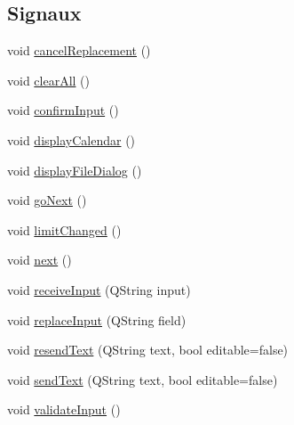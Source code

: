 \subsection*{Signaux}
\begin{DoxyCompactItemize}
\item 
void \hyperlink{classSimpleHotel_1_1SH__InOutStateMachine_abd6f8321716ad2f9a5e9d17cdedca275}{cancel\-Replacement} ()
\item 
void \hyperlink{classSimpleHotel_1_1SH__InOutStateMachine_a2b6d60f624ba23c8fc3e52f73e867c86}{clear\-All} ()
\item 
void \hyperlink{classSimpleHotel_1_1SH__InOutStateMachine_a949cdb448f813f201b6ca827d1c860e9}{confirm\-Input} ()
\item 
void \hyperlink{classSimpleHotel_1_1SH__InOutStateMachine_a2801413ae1cf6e87e38e5f5366622860}{display\-Calendar} ()
\item 
void \hyperlink{classSimpleHotel_1_1SH__InOutStateMachine_a034862097f23ae05f9691ae2b45f5d2a}{display\-File\-Dialog} ()
\item 
void \hyperlink{classSimpleHotel_1_1SH__GenericStateMachine_a1c0cc74f8134d2029b0cc8a2a929023d}{go\-Next} ()
\item 
void \hyperlink{classSimpleHotel_1_1SH__LoopingInOutStateMachine_a0951b18e7a917322d2e926acfbaecc4d}{limit\-Changed} ()
\item 
void \hyperlink{classSimpleHotel_1_1SH__GenericStateMachine_a2de14d4920ae8c10b70c2d73fc2d4a93}{next} ()
\item 
void \hyperlink{classSimpleHotel_1_1SH__InOutStateMachine_a17482446bbf0327e84feb5d6a1a612f0}{receive\-Input} (Q\-String input)
\item 
void \hyperlink{classSimpleHotel_1_1SH__InOutStateMachine_a9117d781c5f8bc02d8b2eba359b0e85a}{replace\-Input} (Q\-String field)
\item 
void \hyperlink{classSimpleHotel_1_1SH__InOutStateMachine_a5db6f59d446182ab9f10e0ccb0399915}{resend\-Text} (Q\-String text, bool editable=false)
\item 
void \hyperlink{classSimpleHotel_1_1SH__InOutStateMachine_ae81d4a51fcd3277ebfc11af978b74c0b}{send\-Text} (Q\-String text, bool editable=false)
\item 
void \hyperlink{classSimpleHotel_1_1SH__InOutStateMachine_a3754990c3f90bb7d59e5028d3d6504d8}{validate\-Input} ()
\end{DoxyCompactItemize}
